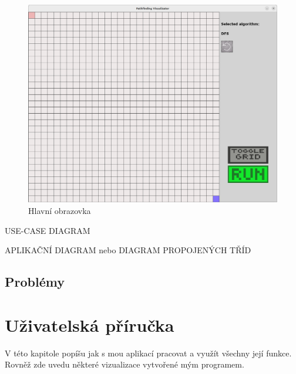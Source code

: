 \documentclass[12pt]{report}			%
\begin{document}
			\begin{figure}[h]
  			\centering 
  			\includegraphics[width = 400pt]{menu.png}
  			\caption{Hlavní obrazovka}
  			\label{menu}
  			\end{figure}
  			
  			
  			
			USE-CASE DIAGRAM
			
			
			APLIKAČNÍ DIAGRAM
			nebo
			DIAGRAM PROPOJENÝCH TŘÍD
			
			\section{Problémy}
			
			
			
		\chapter{Uživatelská příručka}
		V této kapitole popíšu jak s mou aplikací pracovat a využít všechny její funkce. Rovněž zde uvedu některé vizualizace vytvořené mým programem.
\end{document}
